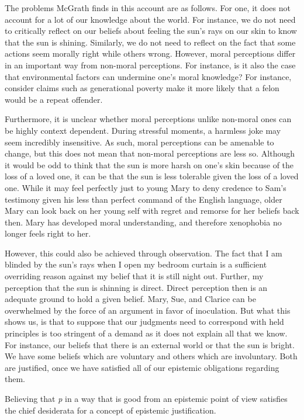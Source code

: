 \documentclass[
  letterpaper,
  DIV=11,
  numbers=noendperiod]{scrartcl}
\theoremstyle{remark}
\begin{document}
The problems McGrath finds in this account are as follows. For one, it
does not account for a lot of our knowledge about the world. For
instance, we do not need to critically reflect on our beliefs about
feeling the sun's rays on our skin to know that the sun is shining.
Similarly, we do not need to reflect on the fact that some actions seem
morally right while others wrong. However, moral perceptions differ in
an important way from non-moral perceptions. For instance, is it also
the case that environmental factors can undermine one's moral knowledge?
For instance, consider claims such as generational poverty make it more
likely that a felon would be a repeat offender.

Furthermore, it is unclear whether moral perceptions unlike non-moral
ones can be highly context dependent. During stressful moments, a
harmless joke may seem incredibly insensitive. As such, moral
perceptions can be amenable to change, but this does not mean that
non-moral perceptions are less so. Although it would be odd to think
that the sun is more harsh on one's skin because of the loss of a loved
one, it can be that the sun is less tolerable given the loss of a loved
one. While it may feel perfectly just to young Mary to deny credence to
Sam's testimony given his less than perfect command of the English
language, older Mary can look back on her young self with regret and
remorse for her beliefs back then. Mary has developed moral
understanding, and therefore xenophobia no longer feels right to her.

However, this could also be achieved through observation. The fact that
I am blinded by the sun's rays when I open my bedroom curtain is a
sufficient overriding reason against my belief that it is still night
out. Further, my perception that the sun is shinning is direct. Direct
perception then is an adequate ground to hold a given belief. Mary, Sue,
and Clarice can be overwhelmed by the force of an argument in favor of
inoculation. But what this shows us, is that to suppose that our
judgments need to correspond with held principles is too stringent of a
demand as it does not explain all that we know. For instance, our
beliefs that there is an external world or that the sun is bright. We
have some beliefs which are voluntary and others which are involuntary.
Both are justified, once we have satisfied all of our epistemic
obligations regarding them.

Believing that \emph{p} in a way that is good from an epistemic point of
view satisfies the chief desiderata for a concept of epistemic
justification.
\end{document}
